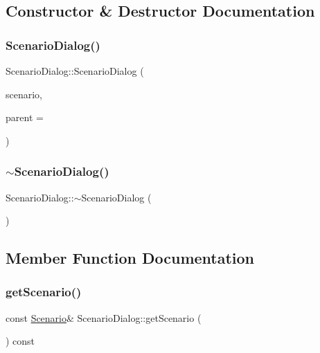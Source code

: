\subsection{Constructor \& Destructor Documentation}
\mbox{\label{class_scenario_dialog_a9788301ad6fbf7a61731d7dfe3c1559c}} 
\subsubsection{\texorpdfstring{ScenarioDialog()}{ScenarioDialog()}}
{\footnotesize\ttfamily Scenario\+Dialog\+::\+Scenario\+Dialog (\begin{DoxyParamCaption}\item[{const \mbox{\hyperlink{class_scenario}{Scenario}} \&}]{scenario,  }\item[{Q\+Widget $\ast$}]{parent = {} }\end{DoxyParamCaption})\hspace{0.3cm}{\ttfamily [explicit]}}

\mbox{\label{class_scenario_dialog_a76d6060b15d0061a888cf7495c9cf093}} 
\subsubsection{\texorpdfstring{$\sim$ScenarioDialog()}{~ScenarioDialog()}}
{\footnotesize\ttfamily Scenario\+Dialog\+::$\sim$\+Scenario\+Dialog (\begin{DoxyParamCaption}{ }\end{DoxyParamCaption})}



\subsection{Member Function Documentation}
\mbox{\label{class_scenario_dialog_a0a44ea9f1021cd338e2fd3d0d2365569}} 
\subsubsection{\texorpdfstring{getScenario()}{getScenario()}}
{\footnotesize\ttfamily const \mbox{\hyperlink{class_scenario}{Scenario}}\& Scenario\+Dialog\+::get\+Scenario (\begin{DoxyParamCaption}{ }\end{DoxyParamCaption}) const\hspace{0.3cm}{\ttfamily [inline]}}

